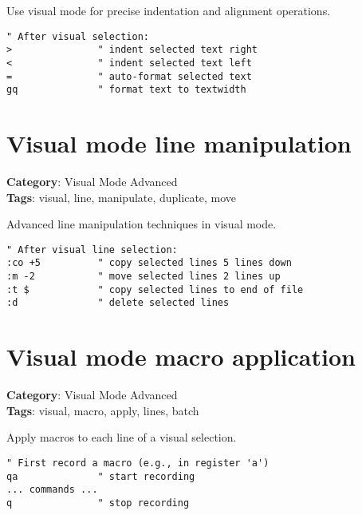 {{{{{{{{{{{{{{{{{{{Use visual mode for precise indentation and alignment operations.

\begin{Exa*}{}
\begin{Verbatim}[fontsize=\footnotesize, breaklines, breakanywhere]
" After visual selection:
>               " indent selected text right
<               " indent selected text left  
=               " auto-format selected text
gq              " format text to textwidth
\end{Verbatim}
\end{Exa*}

\section{Visual mode line manipulation}

\textbf{Category}: Visual Mode Advanced\\ \textbf{Tags}: visual, line, manipulate, duplicate, move
\vspace{0.5cm}

Advanced line manipulation techniques in visual mode.

\begin{Exa*}{}
\begin{Verbatim}[fontsize=\footnotesize, breaklines, breakanywhere]
" After visual line selection:
:co +5          " copy selected lines 5 lines down
:m -2           " move selected lines 2 lines up  
:t $            " copy selected lines to end of file
:d              " delete selected lines
\end{Verbatim}
\end{Exa*}

\section{Visual mode macro application}

\textbf{Category}: Visual Mode Advanced\\ \textbf{Tags}: visual, macro, apply, lines, batch
\vspace{0.5cm}

Apply macros to each line of a visual selection.

\begin{Exa*}{}
\begin{Verbatim}[fontsize=\footnotesize, breaklines, breakanywhere]
" First record a macro (e.g., in register 'a')
qa              " start recording
... commands ...
q               " stop recording


\end{Verbatim}
\end{Exa*}}}}}}}}}}}}}}}}}}}}
